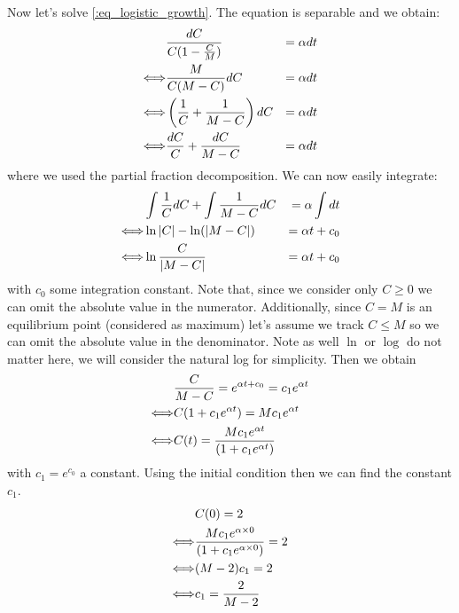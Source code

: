  Now let's solve \eqref{:eq_logistic_growth}. The equation is separable and we obtain:
 \[
\begin{aligned}
 \displaystyle & \frac{d C}{C(1 - \frac{C}{M})}  & = \alpha dt \\
 \displaystyle \Longleftrightarrow & \frac{M}{C(M -C)} dC & = \alpha dt \\
 \displaystyle \Longleftrightarrow & \left( \frac{1}{C } +  \frac{1}{M -C} \right) dC  & = \alpha dt \\
  \displaystyle \Longleftrightarrow & \frac{dC}{C } +  \frac{dC}{M -C}   & = \alpha dt \\
\end{aligned} 
 \]
 where we used the partial fraction decomposition. We can now easily integrate:
  \[
\begin{aligned}
  \displaystyle &  \int \frac{1}{C } dC + \int  \frac{1}{M -C} dC   & = \alpha \int dt \\
   \displaystyle \Longleftrightarrow & \ln |C| - \ln(|M-C|) & = \alpha t + c_0\\
      \displaystyle \Longleftrightarrow & \ln \frac{C}{|M-C|} & = \alpha t + c_0\\
\end{aligned} 
 \]
 with $c_0$ some integration constant. Note that, since we consider only $C \geq 0$ we can omit the absolute value in the numerator. Additionally, since $C = M$ is an equilibrium point (considered as maximum) let's assume we track $C \leq M$ so we can omit the absolute value in the denominator. Note as well $\ln$ or $\log$ do not matter here, we will consider the natural log for simplicity. Then we obtain
   \[
\begin{aligned}
      \displaystyle &  \frac{C}{M-C}  = e^{\alpha t + c_0} = c_1 e^{\alpha t }\\
       \displaystyle \Longleftrightarrow &  C (1 + c_1 e^{\alpha t }) = Mc_1 e^{\alpha t } \\
           \displaystyle \Longleftrightarrow &  C(t)  =  \frac{Mc_1 e^{\alpha t }}{(1 + c_1 e^{\alpha t })} \\   
\end{aligned} 
 \]
 with $c_1 = e^{c_0}$ a constant. Using the initial condition then we can find the constant $c_1$.
    \[
\begin{aligned}
      \displaystyle &  C(0) = 2 \\
       \displaystyle \Longleftrightarrow & \frac{Mc_1 e^{\alpha \times 0 }}{(1 + c_1 e^{\alpha \times 0 })} = 2  \\
           \displaystyle \Longleftrightarrow &  (M -2) c_1 = 2  \\   
              \displaystyle \Longleftrightarrow &c_1 = \frac{2}{M-2} \\   
\end{aligned} 
 \]
